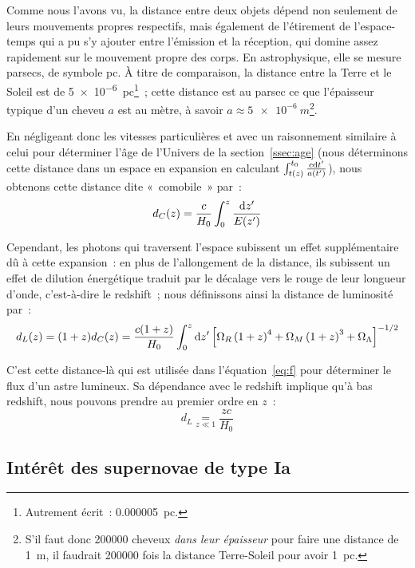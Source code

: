 \documentclass[../main/main.tex]{subfiles}
\begin{document}
Comme nous l'avons vu, la distance entre deux objets dépend non seulement de
leurs mouvements propres respectifs, mais également de l'étirement de
l'espace-temps qui a pu s'y ajouter entre l'émission et la réception, qui domine
assez rapidement sur le mouvement propre des corps. En astrophysique, elle se
mesure parsecs, de symbole pc. À titre de comparaison, la distance entre la
Terre et le Soleil est de \SI{5e-6}{pc}\footnote{Autrement écrit~:
\SI{0.000005}{pc}.}~; cette distance est au parsec ce que l'épaisseur typique
d'un cheveu $a$ est au mètre, à savoir $a \approx \SI{5e-6}{m}$\footnote{S'il
    faut donc \num{200000} cheveux \textit{dans leur épaisseur} pour faire une
    distance de \SI{1}{m}, il faudrait \num{200000} fois la distance
Terre-Soleil pour avoir \SI{1}{pc}.}.

En négligeant donc les vitesses particulières et avec un raisonnement similaire
à celui pour déterminer l'âge de l'Univers de la section~\ref{ssec:age} (nous
déterminons cette distance dans un espace en expansion en calculant
$\int_{t(z)}^{t_0} \frac{c\mathrm{d} t'}{a(t')}$), nous obtenons cette distance dite
«~comobile~» par~:
\begin{equation}
    d_C(z) = \frac{c}{H_0} \int_{0}^{z} \frac{\mathrm{d} z'}{E(z')}
\end{equation}

Cependant, les photons qui traversent l'espace subissent un effet supplémentaire
dû à cette expansion~: en plus de l'allongement de la distance, ils subissent un
effet de dilution énergétique traduit par le décalage vers le rouge de leur
longueur d'onde, c'est-à-dire le redshift~; nous définissons ainsi la distance
de luminosité par~:
\begin{equation}\label{eq:dl}
    d_L(z) = (1+z)d_C(z) = \frac{c(1+z)}{H_0} \int_{0}^{z} \d z'
    \left[
        \Omega_R \left( 1+z \right)^4 +
        \Omega_M \left( 1+z \right)^3 +
        \Omega_\Lambda %
    \right]^{-1/2}
\end{equation}

C'est cette distance-là qui est utilisée dans l'équation~\ref{eq:f} pour
déterminer le flux d'un astre lumineux. Sa dépendance avec le redshift
implique qu'à bas redshift, nous pouvons prendre au premier ordre en $z$~:
\begin{equation}\label{eq:dlz0}
    d_L \underset{z \ll 1}{=} \frac{zc}{H_0}
\end{equation}

\subsection{Intérêt des supernovae de type Ia}\label{ssec:intsne}
\end{document}
